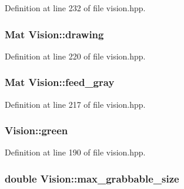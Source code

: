 Definition at line 232 of file vision.\+hpp.

\subsubsection[{\texorpdfstring{drawing}{drawing}}]{\setlength{\rightskip}{0pt plus 5cm}Mat Vision\+::drawing\hspace{0.3cm}{\ttfamily [private]}}\hypertarget{class_vision_a8b8b8f5c0bac3e7cad105ae44c794f8c}{}\label{class_vision_a8b8b8f5c0bac3e7cad105ae44c794f8c}


Definition at line 220 of file vision.\+hpp.

\subsubsection[{\texorpdfstring{feed\+\_\+gray}{feed_gray}}]{\setlength{\rightskip}{0pt plus 5cm}Mat Vision\+::feed\+\_\+gray\hspace{0.3cm}{\ttfamily [private]}}\hypertarget{class_vision_a8840c3a4be531ca9c80055d5aae6408b}{}\label{class_vision_a8840c3a4be531ca9c80055d5aae6408b}


Definition at line 217 of file vision.\+hpp.

\subsubsection[{\texorpdfstring{green}{green}}]{ Vision\+::green\hspace{0.3cm}{\ttfamily [private]}}\hypertarget{class_vision_aa05293fea4a19c7e1dce56d317ddd589}{}\label{class_vision_aa05293fea4a19c7e1dce56d317ddd589}


Definition at line 190 of file vision.\+hpp.

\subsubsection[{\texorpdfstring{max\+\_\+grabbable\+\_\+size}{max_grabbable_size}}]{\setlength{\rightskip}{0pt plus 5cm}double Vision\+::max\+\_\+grabbable\+\_\+size\hspace{0.3cm}{\ttfamily [private]}}\hypertarget{class_vision_af3643289d7252e6a3ad292f739c898a7}{}\label{class_vision_af3643289d7252e6a3ad292f739c898a7}


